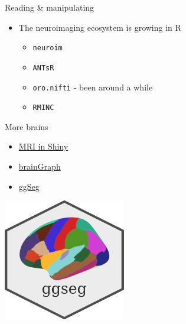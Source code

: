 \documentclass[ignorenonframetext,]{beamer}
\providecommand{\tightlist}{%
  \setlength{\itemsep}{0pt}\setlength{\parskip}{0pt}}
\begin{document}
\begin{frame}[fragile]{Reading \& manipulating}
\protect\hypertarget{reading-manipulating}{}

\begin{itemize}
\tightlist
\item
  The neuroimaging ecosystem is growing in R

  \begin{itemize}
  \tightlist
  \item
    \texttt{neuroim}
  \item
    \texttt{ANTsR}
  \item
    \texttt{oro.nifti} - been around a while
  \item
    \texttt{RMINC}
  \end{itemize}
\end{itemize}

\end{frame}

\begin{frame}{More brains}
\protect\hypertarget{more-brains}{}

\begin{itemize}
\tightlist
\item
  \href{https://community.rstudio.com/t/shiny-contest-submission-shinymri-view-mri-images-in-shiny/23995}{MRI
  in Shiny}
\item
  \href{https://github.com/cwatson/brainGraph}{brainGraph}
\item
  \href{https://github.com/LCBC-UiO/ggseg}{ggSeg}
\end{itemize}

\includegraphics[width=0.4\textwidth,height=\textheight]{../external/images/ggseglogo.png}

\end{frame}
\end{document}
